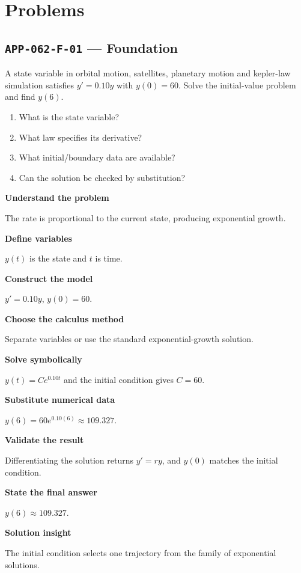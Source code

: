 \documentclass[11pt]{book}
\newcommand{\pid}[1]{\texttt{#1}}
\begin{document}
\section*{Problems}
\subsection*{\pid{APP-062-F-01} — Foundation}
\begin{problembox}
A state variable in orbital motion, satellites, planetary motion and kepler-law simulation satisfies $y'=0.10y$ with $y(0)=60$. Solve the initial-value problem and find $y(6)$.
\end{problembox}
\begin{promptbox}\begin{enumerate}
\item What is the state variable?
\item What law specifies its derivative?
\item What initial/boundary data are available?
\item Can the solution be checked by substitution?
\end{enumerate}\end{promptbox}
\begin{solutionbox}
\textbf{Understand the problem}\par The rate is proportional to the current state, producing exponential growth.\par\medskip
\textbf{Define variables}\par $y(t)$ is the state and $t$ is time.\par\medskip
\textbf{Construct the model}\par $y'=0.10y$, $y(0)=60$.\par\medskip
\textbf{Choose the calculus method}\par Separate variables or use the standard exponential-growth solution.\par\medskip
\textbf{Solve symbolically}\par $y(t)=Ce^{0.10t}$ and the initial condition gives $C=60$.\par\medskip
\textbf{Substitute numerical data}\par $y(6)=60e^{0.10(6)}\approx 109.327$.\par\medskip
\textbf{Validate the result}\par Differentiating the solution returns $y'=ry$, and $y(0)$ matches the initial condition.\par\medskip
\textbf{State the final answer}\par $y(6)\approx 109.327$.\par\medskip
\textbf{Solution insight}\par The initial condition selects one trajectory from the family of exponential solutions.\par\medskip
\end{solutionbox}
\end{document}
